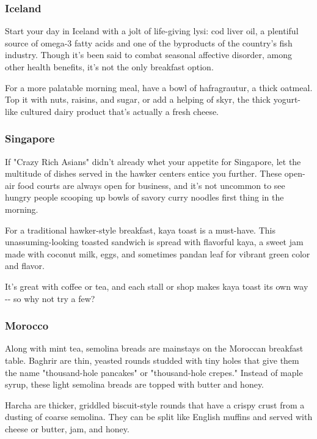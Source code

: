 \hypertarget{iceland}{%
\subsubsection{Iceland}\label{iceland}}

Start your day in Iceland with a jolt of life-giving lysi: cod liver
oil, a plentiful source of omega-3 fatty acids and one of the byproducts
of the country's fish industry. Though it's been said to combat seasonal
affective disorder, among other health benefits, it's not the only
breakfast option.

For a more palatable morning meal, have a bowl of hafragrautur, a thick
oatmeal. Top it with nuts, raisins, and sugar, or add a helping of skyr,
the thick yogurt-like cultured dairy product that's actually a fresh
cheese.

\hypertarget{singapore}{%
\subsubsection{Singapore}\label{singapore}}

If "Crazy Rich Asians" didn't already whet your appetite for Singapore,
let the multitude of dishes served in the hawker centers entice you
further. These open-air food courts are always open for business, and
it's not uncommon to see hungry people scooping up bowls of savory curry
noodles first thing in the morning.

For a traditional hawker-style breakfast, kaya toast is a must-have.
This unassuming-looking toasted sandwich is spread with flavorful kaya,
a sweet jam made with coconut milk, eggs, and sometimes pandan leaf for
vibrant green color and flavor.

It's great with coffee or tea, and each stall or shop makes kaya toast
its own way -\/- so why not try a few?

\hypertarget{morocco}{%
\subsubsection{Morocco}\label{morocco}}

Along with mint tea, semolina breads are mainstays on the Moroccan
breakfast table. Baghrir are thin, yeasted rounds studded with tiny
holes that give them the name "thousand-hole pancakes" or "thousand-hole
crepes." Instead of maple syrup, these light semolina breads are topped
with butter and honey.

Harcha are thicker, griddled biscuit-style rounds that have a crispy
crust from a dusting of coarse semolina. They can be split like English
muffins and served with cheese or butter, jam, and honey.

